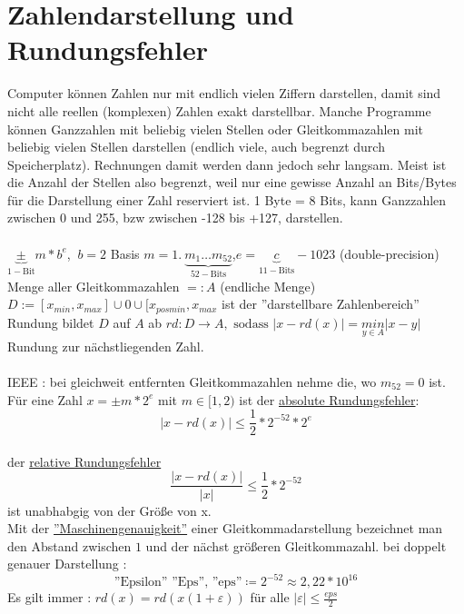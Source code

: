 \section{Zahlendarstellung und Rundungsfehler}
Computer können Zahlen nur mit endlich vielen Ziffern darstellen, damit sind nicht alle reellen 
(komplexen) Zahlen exakt darstellbar. Manche Programme können Ganzzahlen mit beliebig vielen Stellen
oder Gleitkommazahlen mit beliebig vielen Stellen darstellen (endlich viele, auch begrenzt durch 
Speicherplatz). Rechnungen damit werden dann jedoch sehr langsam. Meist ist die Anzahl der Stellen 
also begrenzt, weil nur eine gewisse Anzahl an Bits/Bytes für die Darstellung einer Zahl reserviert
ist. 1 Byte = 8 Bits, kann Ganzzahlen zwischen 0 und 255, bzw zwischen -128 bis +127, darstellen.\\ \\ 
$\underset{1-\text{Bit}}{\underbrace{\pm}} m*b^e $, $ \ b=2$ Basis $m= 
1. \ \underset{52-\text{Bits}}{\underbrace{m_1 \dots m_{52}}}$,\quad$ e=\underset{11-\text{Bits}}
{\underbrace{c}}-1023$ (double-precision)\\
Menge aller Gleitkommazahlen $=: A$ (endliche Menge)\\
$D:= [x_{min},x_{max}] \cup {0} \cup [x_{posmin}, x_{max} $ ist der ''darstellbare Zahlenbereich'' \\
Rundung bildet $D$ auf $A$ ab $rd:D \to A, \text{ sodass } |x-rd(x)|=\underset{y\in A}{min}|x-y|$\\
Rundung zur nächstliegenden Zahl.\\
\\
IEEE : bei gleichweit entfernten Gleitkommazahlen nehme die, wo $m_{52}=0$ ist.\\
Für eine Zahl $x=\pm m*2^e$ mit $m\in [1,2)$ ist der \underline{absolute Rundungsfehler}: $$|x-
rd(x)| \leq 
\frac{1}{2}*2^{-52}*2^e$$\\
der \underline{relative Rundungsfehler} $$\frac{|x-rd(x)|}{|x|}\leq \frac{1}{2}*2^{-52}$$ ist unabhabgig von der Größe von x.
\\
Mit der \underline{''Maschinengenauigkeit''} einer Gleitkommadarstellung bezeichnet man den Abstand
zwischen $1$ und der nächst größeren Gleitkommazahl.
bei doppelt genauer Darstellung : $$
    \text{''Epsilon'' ''Eps'', ''eps''}\coloneqq 2^{-52} \approx 2,22*10^{16}$$
Es gilt immer : $rd(x) = rd(x(1+\varepsilon))$ für alle $|\varepsilon|\leq \frac{eps}{2}$\\

